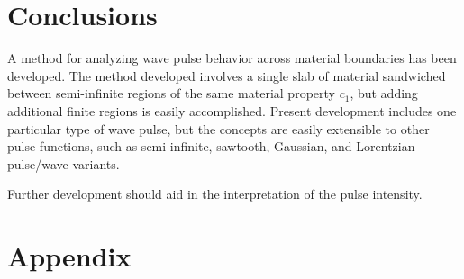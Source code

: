 \documentclass[twocolumn, letterpaper]{article}
\begin{document}
\section*{Conclusions}
A method for analyzing wave pulse behavior across material boundaries has been developed. The method developed involves a single slab of material sandwiched between semi-infinite regions of the same material property $c_1$, but adding additional finite regions is easily accomplished. Present development includes one particular type of wave pulse, but the concepts are easily extensible to other pulse functions, such as semi-infinite, sawtooth, Gaussian, and Lorentzian pulse/wave variants. 

Further development should aid in the interpretation of the pulse intensity. 





\printbibliography

\onecolumn
\section*{Appendix}
\end{document}
